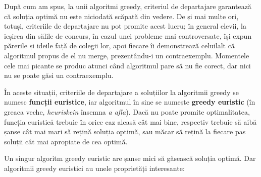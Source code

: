 După cum am spus, la unii algoritmi greedy, criteriul de departajare
garantează că soluția optimă nu este niciodată scăpată din vedere. De și mai
multe ori, totuși, criteriile de departajare nu pot promite acest lucru; în
general elevii, la ieșirea din sălile de concurs, în cazul unei probleme mai
controversate, își expun părerile și ideile față de colegii lor, apoi fiecare
îi demonstrează celuilalt că algoritmul propus de el nu merge, prezentându-i
un contraexemplu. Momentele cele mai picante se produc atunci când algoritmul
pare să nu fie corect, dar nici nu se poate găsi un contraexemplu.

În aceste situații, criteriile de departajare a soluțiilor la algoritmii
greedy se numesc {\bf funcții euristice}, iar algoritmul în sine se numește
{\bf greedy euristic} (în greaca veche, {\it heuriskein} însemna {\it a
  afla}). Dacă nu poate promite optimalitatea, funcția euristică trebuie în
orice caz aleasă cât mai bine, respectiv trebuie să aibă șanse cât mai mari să
rețină soluția optimă, sau măcar să rețină la fiecare pas soluții cât mai
apropiate de cea optimă.

Un singur algoritm greedy euristic are șanse mici să găsească soluția
optimă. Dar algoritmii greedy euristici au unele proprietăți interesante:

